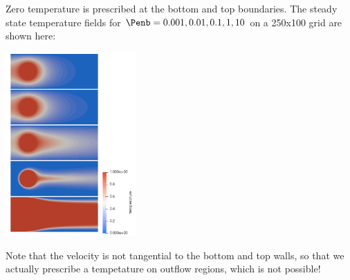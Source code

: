 Zero temperature is prescribed at the bottom and top boundaries.
The steady state temperature fields for $\Penb=0.001, 0.01, 0.1, 1, 10$ 
on a 250x100 grid are shown here:

\begin{center}
\includegraphics[width=5cm]{python_codes/fieldstone_65/results/exp4/temps}
\end{center}

Note that the velocity is not tangential to the bottom and top walls, so that we actually 
prescribe a tempetature on outflow regions, which is not possible! 


